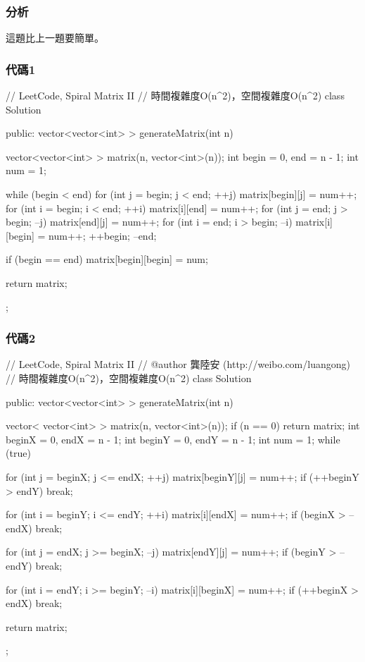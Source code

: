 \subsubsection{分析}
這題比上一題要簡單。


\subsubsection{代碼1}
\begin{Code}
// LeetCode, Spiral Matrix II
// 時間複雜度O(n^2)，空間複雜度O(n^2)
class Solution {
public:
    vector<vector<int> > generateMatrix(int n) {
        vector<vector<int> > matrix(n, vector<int>(n));
        int begin = 0, end = n - 1;
        int num = 1;

        while (begin < end) {
            for (int j = begin; j < end; ++j) matrix[begin][j] = num++;
            for (int i = begin; i < end; ++i) matrix[i][end] = num++;
            for (int j = end; j > begin; --j) matrix[end][j] = num++;
            for (int i = end; i > begin; --i) matrix[i][begin] = num++;
            ++begin;
            --end;
        }

        if (begin == end) matrix[begin][begin] = num;

        return matrix;
    }
};
\end{Code}


\subsubsection{代碼2}
\begin{Code}
// LeetCode, Spiral Matrix II
// @author 龔陸安 (http://weibo.com/luangong)
// 時間複雜度O(n^2)，空間複雜度O(n^2)
class Solution {
public:
    vector<vector<int> > generateMatrix(int n) {
        vector< vector<int> > matrix(n, vector<int>(n));
        if (n == 0) return matrix;
        int beginX = 0, endX = n - 1;
        int beginY = 0, endY = n - 1;
        int num = 1;
        while (true) {
            for (int j = beginX; j <= endX; ++j) matrix[beginY][j] = num++;
            if (++beginY > endY) break;

            for (int i = beginY; i <= endY; ++i) matrix[i][endX] = num++;
            if (beginX > --endX) break;

            for (int j = endX; j >= beginX; --j) matrix[endY][j] = num++;
            if (beginY > --endY) break;

            for (int i = endY; i >= beginY; --i) matrix[i][beginX] = num++;
            if (++beginX > endX) break;
        }
        return matrix;
    }
};
\end{Code}


